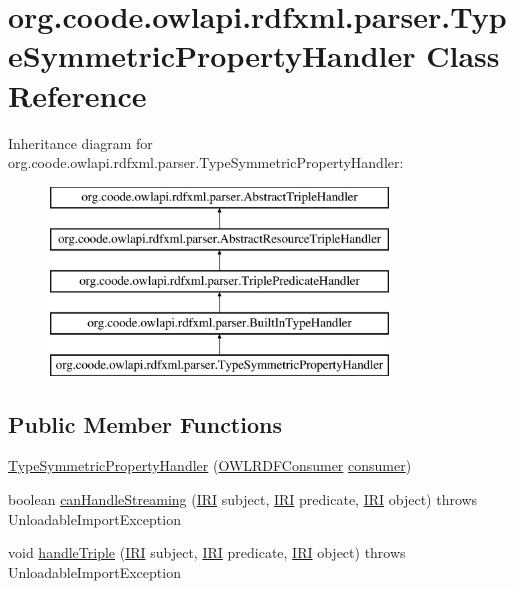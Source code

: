 \hypertarget{classorg_1_1coode_1_1owlapi_1_1rdfxml_1_1parser_1_1_type_symmetric_property_handler}{\section{org.\-coode.\-owlapi.\-rdfxml.\-parser.\-Type\-Symmetric\-Property\-Handler Class Reference}
\label{classorg_1_1coode_1_1owlapi_1_1rdfxml_1_1parser_1_1_type_symmetric_property_handler}
}
Inheritance diagram for org.\-coode.\-owlapi.\-rdfxml.\-parser.\-Type\-Symmetric\-Property\-Handler\-:\begin{figure}[H]
\begin{center}
\leavevmode
\includegraphics[height=5.000000cm]{classorg_1_1coode_1_1owlapi_1_1rdfxml_1_1parser_1_1_type_symmetric_property_handler}
\end{center}
\end{figure}
\subsection*{Public Member Functions}
\begin{DoxyCompactItemize}
\item 
\hyperlink{classorg_1_1coode_1_1owlapi_1_1rdfxml_1_1parser_1_1_type_symmetric_property_handler_a88f7336bf154c3afaeb51c48a8497edf}{Type\-Symmetric\-Property\-Handler} (\hyperlink{classorg_1_1coode_1_1owlapi_1_1rdfxml_1_1parser_1_1_o_w_l_r_d_f_consumer}{O\-W\-L\-R\-D\-F\-Consumer} \hyperlink{classorg_1_1coode_1_1owlapi_1_1rdfxml_1_1parser_1_1_abstract_triple_handler_a4ccf4d898ff01eb1cadfa04b23d54e9c}{consumer})
\item 
boolean \hyperlink{classorg_1_1coode_1_1owlapi_1_1rdfxml_1_1parser_1_1_type_symmetric_property_handler_a6eeaff371b8e8f326d5e6f4992a88b86}{can\-Handle\-Streaming} (\hyperlink{classorg_1_1semanticweb_1_1owlapi_1_1model_1_1_i_r_i}{I\-R\-I} subject, \hyperlink{classorg_1_1semanticweb_1_1owlapi_1_1model_1_1_i_r_i}{I\-R\-I} predicate, \hyperlink{classorg_1_1semanticweb_1_1owlapi_1_1model_1_1_i_r_i}{I\-R\-I} object)  throws Unloadable\-Import\-Exception 
\item 
void \hyperlink{classorg_1_1coode_1_1owlapi_1_1rdfxml_1_1parser_1_1_type_symmetric_property_handler_a11da866c1856443b0f77ebcd75204bb7}{handle\-Triple} (\hyperlink{classorg_1_1semanticweb_1_1owlapi_1_1model_1_1_i_r_i}{I\-R\-I} subject, \hyperlink{classorg_1_1semanticweb_1_1owlapi_1_1model_1_1_i_r_i}{I\-R\-I} predicate, \hyperlink{classorg_1_1semanticweb_1_1owlapi_1_1model_1_1_i_r_i}{I\-R\-I} object)  throws Unloadable\-Import\-Exception 
\end{DoxyCompactItemize}
